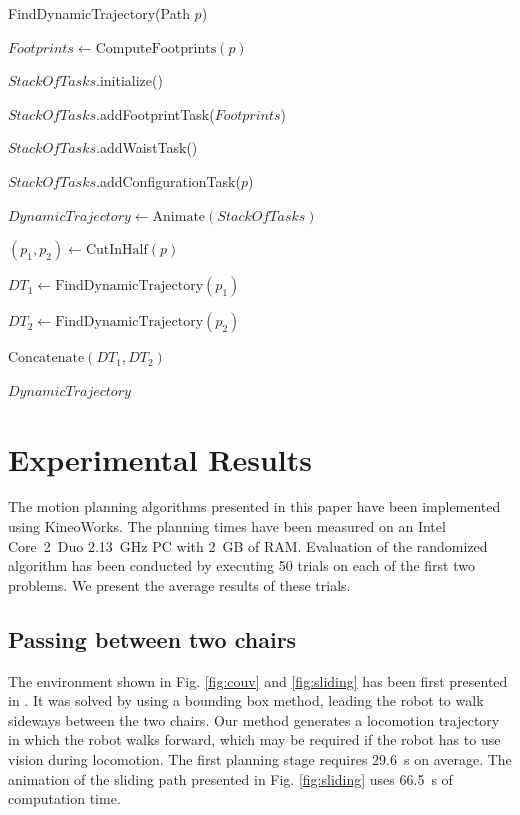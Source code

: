 \documentclass{article}
\begin{document}
\begin{algorithm}[h]
\caption{FindDynamicTrajectory(Path $p$)}
\label{alg:walk}
\begin{algorithmic}
\STATE $Footprints \leftarrow \text{ComputeFootprints}(p)$

\STATE $StackOfTasks$.initialize()

\STATE $StackOfTasks$.addFootprintTask($Footprints$)

\STATE $StackOfTasks$.addWaistTask()

\STATE $StackOfTasks$.addConfigurationTask($p$)

\STATE $DynamicTrajectory \leftarrow \text{Animate}(StackOfTasks)$


\STATE $(p_1,p_2) \leftarrow \text{CutInHalf}(p)$

\STATE $DT_1 \leftarrow \text{FindDynamicTrajectory}(p_1)$

\STATE $DT_2 \leftarrow \text{FindDynamicTrajectory}(p_2)$

\RETURN $\text{Concatenate}(DT_1,DT_2)$

\ELSE

\RETURN $DynamicTrajectory$

\ENDIF
\end{algorithmic}
\end{algorithm}





\section{Experimental Results}

\label{sec:exp}

The motion planning algorithms presented in this paper have been implemented
using KineoWorks\texttrademark \cite{laumond2006kcs}. The planning times have been measured
on an Intel Core~2~Duo 2.13~GHz PC with 2~GB of RAM. Evaluation of the
randomized algorithm has been conducted by executing 50 trials on each
of the first two problems. We present the average results of these trials.



\subsection{Passing between two chairs}

The environment shown in Fig. \ref{fig:couv} and \ref{fig:sliding} has been
first presented in \cite{el2011path}. It was solved by using a bounding
box method, leading the robot to walk sideways between the two chairs.
Our method generates a locomotion  trajectory in which the robot walks
forward, which may be required if the robot has to use vision during
locomotion. The first planning stage  requires 29.6~s
on  average.   The  animation  of   the  sliding  path   presented  in
Fig.   \ref{fig:sliding}   uses  66.5~s  of  computation   time.
\end{document}
